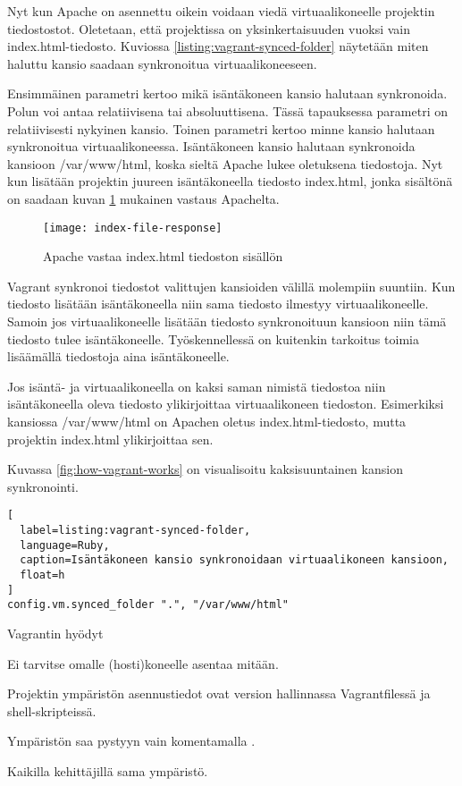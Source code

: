 Nyt kun Apache on asennettu oikein voidaan viedä virtuaalikoneelle projektin tiedostostot. Oletetaan, että projektissa on yksinkertaisuuden vuoksi vain index.html-tiedosto. Kuviossa \ref{listing:vagrant-synced-folder} näytetään miten haluttu kansio saadaan synkronoitua virtuaalikoneeseen.

Ensimmäinen parametri kertoo mikä isäntäkoneen kansio halutaan synkronoida. Polun voi antaa relatiivisena tai absoluuttisena. Tässä tapauksessa parametri on relatiivisesti nykyinen kansio. Toinen parametri kertoo minne kansio halutaan synkronoitua virtuaalikoneessa. Isäntäkoneen kansio halutaan synkronoida kansioon /var/www/html, koska sieltä Apache lukee oletuksena tiedostoja. Nyt kun lisätään projektin juureen isäntäkoneella tiedosto index.html, jonka sisältönä on  saadaan kuvan \ref{fig:index-file-response} mukainen vastaus Apachelta.

\begin{figure}[h]
  \texttt{[image: index-file-response]}
  \caption{Apache vastaa index.html tiedoston sisällön}
  \label{fig:index-file-response}
\end{figure}

Vagrant synkronoi tiedostot valittujen kansioiden välillä molempiin suuntiin. Kun tiedosto lisätään isäntäkoneella niin sama tiedosto ilmestyy virtuaalikoneelle. Samoin jos virtuaalikoneelle lisätään tiedosto synkronoituun kansioon niin tämä tiedosto tulee isäntäkoneelle. Työskennellessä on kuitenkin tarkoitus toimia lisäämällä tiedostoja aina isäntäkoneelle.


Jos isäntä- ja virtuaalikoneella on kaksi saman nimistä tiedostoa niin isäntäkoneella oleva tiedosto ylikirjoittaa virtuaalikoneen tiedoston. Esimerkiksi kansiossa /var/www/html on Apachen oletus index.html-tiedosto, mutta projektin index.html ylikirjoittaa sen.

Kuvassa \ref{fig:how-vagrant-works} on visualisoitu kaksisuuntainen kansion synkronointi.

\begin{lstlisting}[
  label=listing:vagrant-synced-folder,
  language=Ruby,
  caption=Isäntäkoneen kansio synkronoidaan virtuaalikoneen kansioon,
  float=h
]
config.vm.synced_folder ".", "/var/www/html"
\end{lstlisting}

Vagrantin hyödyt
\begin{bullet-list}
  \item Ei tarvitse omalle (hosti)koneelle asentaa mitään.
  \item Projektin ympäristön asennustiedot ovat version hallinnassa Vagrantfilessä ja shell-skripteissä.
  \item Ympäristön saa pystyyn vain komentamalla .
  \item Kaikilla kehittäjillä sama ympäristö.
\end{bullet-list}

